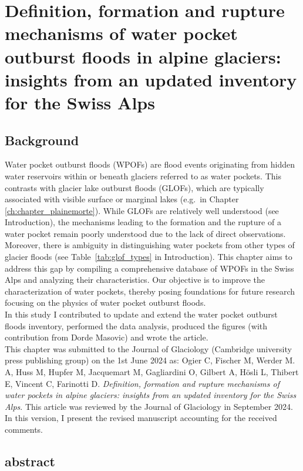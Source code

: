 \chapter{Definition, formation and rupture mechanisms of water pocket outburst floods in alpine glaciers: insights from an updated inventory for the Swiss Alps}
\label{ch:chapter_WPOFs}

\section{Background}

Water pocket outburst floods (WPOFs) are flood events originating from hidden water reservoirs within or beneath glaciers referred to as water pockets. This contrasts with glacier lake outburst floods (GLOFs), which are typically associated with visible surface or marginal lakes (e.g.\ in Chapter \ref{ch:chapter_plainemorte}). While GLOFs are relatively well understood (see Introduction), the mechanisms leading to the formation and the rupture of a water pocket remain poorly understood due to the lack of direct observations. Moreover, there is ambiguity in distinguishing water pockets from other types of glacier floods (see Table~\ref{tab:glof_types} in Introduction). This chapter aims to address this gap by compiling a comprehensive database of WPOFs in the Swiss Alps and analyzing their characteristics. Our objective is to improve the characterization of water pockets, thereby posing foundations for future research focusing on the physics of water pocket outburst floods.\\
%
In this study I contributed to update and extend the water pocket outburst floods inventory, performed the data analysis, produced the figures (with contribution from Dorde Masovic) and wrote the article. \\
%
This chapter was submitted to the Journal of Glaciology (Cambridge university press publishing
group) on the 1st June 2024 as: Ogier C, Fischer M, Werder M. A, Huss M, Hupfer M, Jacquemart M, Gagliardini O, Gilbert A, Hösli L, Thibert E, Vincent C, Farinotti D. \textit{Definition, formation and rupture mechanisms of water pockets in alpine glaciers: insights from an updated inventory for the Swiss Alps}. This article was reviewed by the Journal of Glaciology in September 2024. In this version, I present the revised manuscript accounting for the received comments. \\

\clearpage

\section{abstract}

